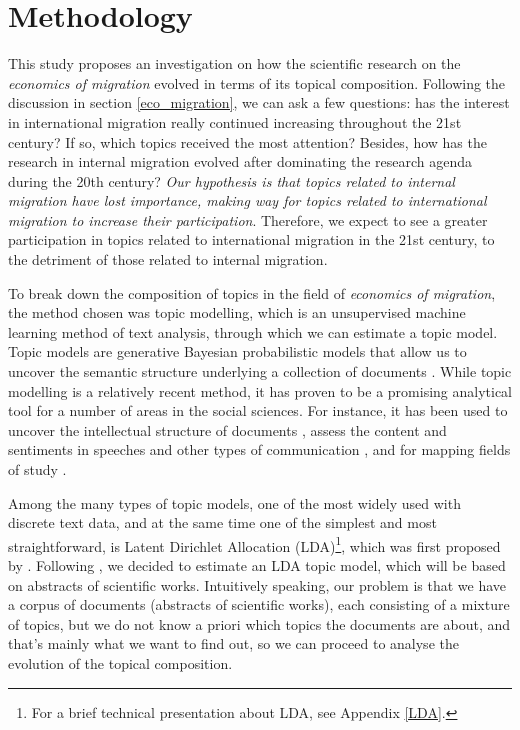 \section{Methodology} \label{methodology}

This study proposes an investigation on how the scientific research on the \textit{economics of migration} evolved in terms of its topical composition. Following the discussion in section \ref{eco_migration}, we can ask a few questions: has the interest in international migration really continued increasing throughout the 21st century? If so, which topics received the most attention? Besides, how has the research in internal migration evolved after dominating the research agenda during the 20th century? \textit{Our hypothesis is that topics related to internal migration have lost importance, making way for topics related to international migration to increase their participation}. Therefore, we expect to see a greater participation in topics related to international migration in the 21st century, to the detriment of those related to internal migration. 

To break down the composition of topics in the field of \textit{economics of migration}, the method chosen was topic modelling, which is an unsupervised machine learning method of text analysis, through which we can estimate a topic model. Topic models are generative Bayesian probabilistic models that allow us to uncover the semantic structure underlying a collection of documents \citep{blei_latent_2003, blei_topic_2009, evans_machine_2016}. While topic modelling is a relatively recent method, it has proven to be a promising analytical tool for a number of areas in the social sciences. For instance, it has been used to uncover the intellectual structure of documents \citep{griffiths_finding_2004}, assess the content and sentiments in speeches and other types of communication \citep{grimmer_bayesian_2010, hansen_transparency_2018}, and for mapping fields of study \citep{ambrosino_what_2018, pisarevskaya_mapping_2020}. 

Among the many types of topic models, one of the most widely used with discrete text data, and at the same time one of the simplest and most straightforward, is Latent Dirichlet Allocation (LDA)\footnote{For a brief technical presentation about LDA, see Appendix \ref{LDA}.}, which was first proposed by \cite{blei_latent_2003}. Following \cite{pisarevskaya_mapping_2020}, we decided to estimate an LDA topic model, which will be based on abstracts of scientific works. Intuitively speaking, our problem is that we have a corpus of documents (abstracts of scientific works), each consisting of a mixture of topics, but we do not know a priori which topics the documents are about, and that's mainly what we want to find out, so we can proceed to analyse the evolution of the topical composition.

